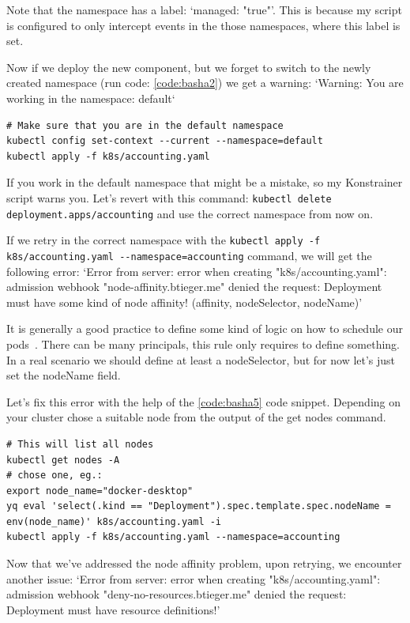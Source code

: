Note that the namespace has a label: `managed: "true"'. This is because my script is configured to only intercept events in the those namespaces, where this label is set.

Now if we deploy the new component, but we forget to switch to the newly created namespace (run code: \ref{code:basha2}) we get a warning: `Warning: You are working in the namespace: default`

\begin{lstlisting}[caption={Deploy the Accounting module},language=mybash,label=code:basha2]
# Make sure that you are in the default namespace
kubectl config set-context --current --namespace=default
kubectl apply -f k8s/accounting.yaml
\end{lstlisting}

If you work in the default namespace that might be a mistake, so my Konstrainer script warns you. Let's revert with this command: \lstinline|kubectl delete deployment.apps/accounting| and use the correct namespace from now on.

If we retry in the correct namespace with the \lstinline|kubectl apply -f k8s/accounting.yaml --namespace=accounting| command, we will get the following error: `Error from server: error when creating "k8s/accounting.yaml": admission webhook "node-affinity.btieger.me" denied the request: Deployment must have some kind of node affinity! (affinity, nodeSelector, nodeName)'

It is generally a good practice to define some kind of logic on how to schedule our pods~\cite{Affinity}. There can be many principals, this rule only requires to define something. In a real scenario we should define at least a nodeSelector, but for now let's just set the nodeName field.

Let's fix this error with the help of the \ref{code:basha5} code snippet. Depending on your cluster chose a suitable node from the output of the get nodes command.

\begin{lstlisting}[caption={Fix node affinity error},language=mybash,label=code:basha5]
# This will list all nodes
kubectl get nodes -A
# chose one, eg.:
export node_name="docker-desktop"
yq eval 'select(.kind == "Deployment").spec.template.spec.nodeName = env(node_name)' k8s/accounting.yaml -i
kubectl apply -f k8s/accounting.yaml --namespace=accounting
\end{lstlisting}

Now that we've addressed the node affinity problem, upon retrying, we encounter another issue: `Error from server: error when creating "k8s/accounting.yaml": admission webhook "deny-no-resources.btieger.me" denied the request: Deployment must have resource definitions!'

